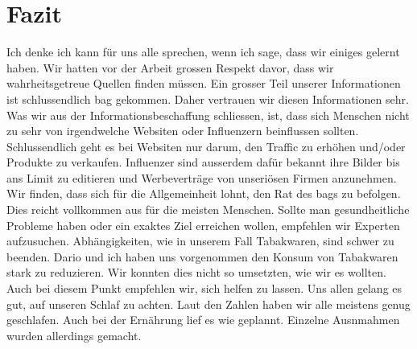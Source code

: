 \chapter{Fazit}
\authortoc{\jonas}{\chapterident}
Ich denke ich kann für uns alle sprechen, wenn ich sage, dass wir einiges gelernt haben.
\newline
Wir hatten vor der Arbeit grossen Respekt davor, dass wir wahrheitsgetreue Quellen finden müssen. Ein grosser Teil unserer Informationen ist schlussendlich \acs{bag} gekommen. Daher vertrauen wir diesen Informationen sehr.
\newline
Was wir aus der Informationsbeschaffung schliessen, ist, dass sich Menschen nicht zu sehr von irgendwelche Websiten oder Influenzern beinflussen sollten. Schlussendlich geht es bei Websiten nur darum, den Traffic zu erhöhen und/oder Produkte zu verkaufen. Influenzer sind ausserdem dafür bekannt ihre Bilder bis ans Limit zu editieren und Werbeverträge von unseriösen Firmen anzunehmen. 
\newline
Wir finden, dass sich für die Allgemeinheit lohnt, den Rat des \acsp{bag} zu befolgen. Dies reicht vollkommen aus für die meisten Menschen. Sollte man gesundheitliche Probleme haben oder ein exaktes Ziel erreichen wollen, empfehlen wir Experten aufzusuchen.
\newline
\newline
Abhängigkeiten, wie in unserem Fall Tabakwaren, sind schwer zu beenden. Dario und ich haben uns vorgenommen den Konsum von Tabakwaren stark zu reduzieren. Wir konnten dies nicht so umsetzten, wie wir es wollten. Auch bei diesem Punkt empfehlen wir, sich helfen zu lassen.
\newline
Uns allen gelang es gut, auf unseren Schlaf zu achten. Laut den Zahlen haben wir alle meistens genug geschlafen. Auch bei der Ernährung lief es wie geplannt. Einzelne Ausnmahmen wurden allerdings gemacht.